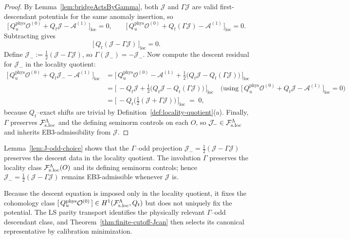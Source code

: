 \begin{proof}
By Lemma~\ref{lem:bridgeActsByGamma}, both $\mathcal J$ and $\Gamma\mathcal J$
are valid first-descendant potentials for the same anomaly insertion, so
\[
\big[\,Q_u^{\mathrm{phys}}\mathcal O^{(0)}+Q_t\mathcal J-\mathcal A^{(1)}\,\big]_{\mathrm{loc}}=0,
\qquad
\big[\,Q_u^{\mathrm{phys}}\mathcal O^{(0)}+Q_t(\Gamma\mathcal J)-\mathcal A^{(1)}\,\big]_{\mathrm{loc}}=0.
\]
Subtracting gives
\[
\big[\,Q_t(\mathcal J-\Gamma\mathcal J)\,\big]_{\mathrm{loc}}=0.
\]
Define $\mathcal J_-:=\tfrac12(\mathcal J-\Gamma\mathcal J)$, so $\Gamma(\mathcal J_-)=-\mathcal J_-$.
Now compute the descent residual for $\mathcal J_-$ in the locality quotient:
\[
\begin{aligned}
\big[\,Q_u^{\mathrm{phys}}\mathcal O^{(0)}+Q_t\mathcal J_- - \mathcal A^{(1)}\,\big]_{\mathrm{loc}}
&=\Big[\,Q_u^{\mathrm{phys}}\mathcal O^{(0)}-\mathcal A^{(1)}+\tfrac12\big(Q_t\mathcal J-Q_t(\Gamma\mathcal J)\big)\,\Big]_{\mathrm{loc}} \\
&=\Big[\,-Q_t\mathcal J+\tfrac12\big(Q_t\mathcal J-Q_t(\Gamma\mathcal J)\big)\,\Big]_{\mathrm{loc}}
\quad\text{(using }\big[\,Q_u^{\mathrm{phys}}\mathcal O^{(0)}+Q_t\mathcal J-\mathcal A^{(1)}\,\big]_{\mathrm{loc}}=0\text{)}\\
&=\Big[\,-Q_t\!\big(\tfrac12(\mathcal J+\Gamma\mathcal J)\big)\,\Big]_{\mathrm{loc}}
\;=\;0,
\end{aligned}
\]
because $Q_t$--exact shifts are trivial by Definition~\ref{def:locality-quotient}\textnormal{(a)}.
Finally, $\Gamma$ preserves $\mathcal F_{\mathrm{s.loc}}^\Lambda$ and the defining seminorm controls on each $O$,
so $\mathcal J_-\in\mathcal F_{\mathrm{s.loc}}^\Lambda$ and inherits EB3-admissibility from $\mathcal J$.
\end{proof}

\begin{remark}
Lemma~\ref{lem:J-odd-choice} shows that the $\Gamma$--odd projection
$\mathcal J_-=\tfrac12(\mathcal J-\Gamma\mathcal J)$ preserves the descent data
in the locality quotient.
The involution $\Gamma$ preserves the locality class $\mathcal F_{\mathrm{s.loc}}^\Lambda(O)$ and its defining
seminorm controls; hence $\mathcal J_-=\tfrac12(\mathcal J-\Gamma\mathcal J)$ remains
EB3-admissible whenever $\mathcal J$ is.
\par
Because the descent equation is imposed only in the locality quotient, it fixes the
cohomology class $[\,Q_u^{\mathrm{phys}}\mathcal O^{(0)}\,]\in H^1(\mathcal F_{\mathrm{s.loc}}^\Lambda,Q_t)$ but does not
uniquely fix the potential. The LS parity transport identifies the physically relevant
\(\Gamma\)--odd descendant class, and Theorem~\ref{thm:finite-cutoff-Jcan} then selects its
canonical representative by calibration minimization.
\end{remark}


